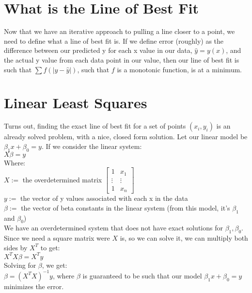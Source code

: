 \documentclass{article}
\begin{document}
\section{What is the Line of Best Fit}
Now that we have an iterative approach to pulling a line closer to a point, we need to define what a line of best fit is. If we define error (roughly) as the difference between our predicted y for each x value in our data, $\hat{y} = y(x)$, and the actual y value from each data point in our value, then our line of best fit is such that $\sum f(|y-\hat{y}|)$, such that $f$ is a monotonic function, is at a minimum.

\section{Linear Least Squares}

Turns out, finding the exact line of best fit for a set of points $(x_i, y_i)$ is an already solved problem, with a nice, closed form solution. Let our linear model be $\beta_1 x + \beta_0 = y$. If we consider the linear system:\\
$X\beta = y$\\
Where:\\
$X :=$ the overdetermined matrix
$\begin{bmatrix}
	1 & x_1\\
	\vdots & \vdots\\
	1 & x_n
\end{bmatrix}$\\
$y:=$ the vector of y values associated with each x in the data\\
$\beta :=$ the vector of beta constants in the linear system (from this model, it's $\beta_1$ and $\beta_0$)\\
We have an overdetermined system that does not have exact solutions for $\beta_1, \beta_0$. Since we need a square matrix were $X$ is, so we can solve it, we can multiply both sides by $X^T$ to get:\\
$X^TX\beta=X^Ty$\\
Solving for $\beta$, we get:\\
$\beta=(X^TX)^{-1}y$, where $\beta$ is guaranteed to be such that our model $\beta_1 x + \beta_0 = y$ minimizes the error.
\end{document}

